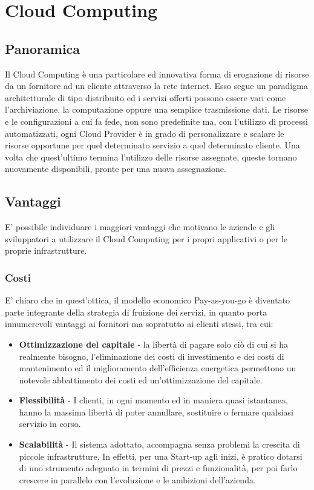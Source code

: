 \section{Cloud Computing}
\subsection{Panoramica}
Il Cloud Computing è una particolare ed innovativa forma di erogazione di risorse da un fornitore ad un cliente attraverso la rete internet. Esso segue un paradigma architetturale di tipo distribuito ed i servizi offerti possono essere vari come l'archiviazione, la computazione oppure una semplice trasmissione dati.
Le risorse e le configurazioni a cui fa fede, non sono predefinite ma, con l'utilizzo di processi automatizzati, ogni
 Cloud Provider è in grado di personalizzare e scalare le risorse opportune per quel determinato servizio a quel determinato cliente. Una volta che quest'ultimo termina l'utilizzo delle risorse assegnate, queste tornano nuovamente disponibili, pronte per una nuova assegnazione.

\subsection{Vantaggi}
E' possibile individuare i maggiori vantaggi che motivano le aziende e gli sviluppatori a utilizzare il Cloud Computing per i propri applicativi o per le proprie infrastrutture.
\subsubsection{Costi}
E' chiaro che in quest'ottica, il modello economico Pay-as-you-go è diventato parte integrante della strategia di fruizione dei servizi, in quanto porta innumerevoli vantaggi ai fornitori ma sopratutto ai clienti stessi, tra cui:
    \begin{itemize}
    \item \textbf{Ottimizzazione del capitale} - la libertà di pagare solo ciò di cui si ha realmente bisogno, l'eliminazione dei costi di investimento e dei costi di mantenimento ed il miglioramento dell'efficienza energetica permettono un notevole abbattimento dei costi ed un'ottimizzazione del capitale.
    \item \textbf{Flessibilità} - I clienti, in ogni momento ed in maniera quasi istantanea, hanno la massima libertà di poter annullare, sostituire o fermare qualsiasi servizio in corso.
    \item \textbf{Scalabilità} - Il sistema adottato, accompagna senza problemi la crescita di piccole infrastrutture. In effetti, per una Start-up agli inizi, è pratico dotarsi di uno strumento adeguato in termini di prezzi e funzionalità, per poi farlo crescere in parallelo con l'evoluzione e le ambizioni dell'azienda.
    \end{itemize}

